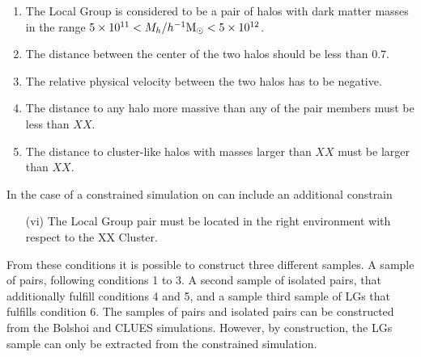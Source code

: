 \documentclass[usenatbib]{latex/mn2e}
\begin{document}
\begin{enumerate}
\item{The Local Group is considered to be a pair of halos with dark matter 
masses in the range $5\times10^{11}<M_{h}/\hMsun < 5\times 10^{12}$.}

\item{The distance between the center of the two halos should be less than 
$0.7$\hMpc.}

\item{The relative physical velocity between the two halos has to be 
negative.}

\item{The distance to any halo more massive than any of the pair members 
must be less than $XX$\hMpc.}

\item{The distance to cluster-like halos with masses larger than $XX$\hMpc 
must be larger than $XX$\hMpc.}
\end{enumerate}


In the case of a constrained simulation on can include an additional 
constrain


\begin{enumerate}
\item[(vi)]{The Local Group pair must be located in the right environment 
with respect to the XX Cluster.}
\end{enumerate}


From these conditions it is possible to construct three different samples.
A sample of pairs, following conditions 1 to 3. A second sample of 
isolated pairs, that additionally fulfill conditions 4 and 5, and a sample
third sample of LGs that fulfills condition 6. The samples of pairs and 
isolated pairs can be constructed from the Bolshoi and CLUES simulations. 
However, by construction, the LGs sample can only be extracted from the 
constrained simulation.
\end{document}
